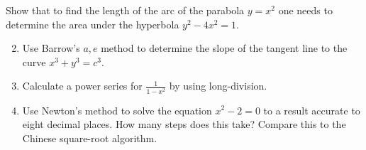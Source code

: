 \begin{exercises}{}{}
\exstart%
  Show that to find the length of the arc of the parabola $y=x^2$ one needs to determine the area under the hyperbola $y^2-4x^2=1$.
\begin{enumerate}\setcounter{enumi}{1}
	\item%
	Use Barrow's $a,e$ method to determine the slope of the tangent line to the curve $x^3+y^3=c^3$.
	
	\item%
	Calculate a power series for $\frac 1{1-x^2}$ by using long-division.
	
	\item%
	Use Newton's method to solve the equation $x^2-2=0$ to a result accurate to eight decimal places. How many steps does this take? Compare this to the Chinese square-root algorithm.
	
	

\end{enumerate}
\end{exercises}
